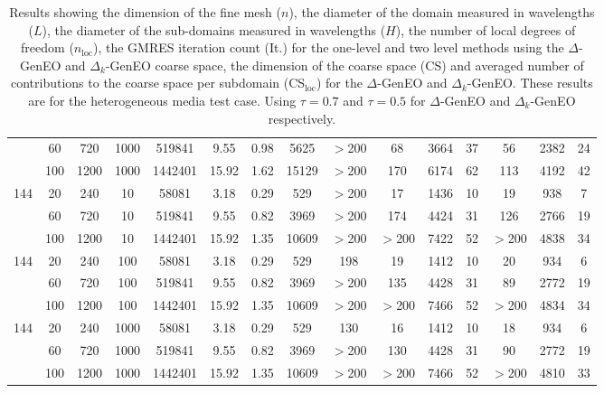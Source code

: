 \documentclass[preprint,3p,times]{elsarticle}
\theoremstyle{definition}
\numberwithin{equation}{section}
\begin{document}
{\begin{table}[H]
\begin{tabular}{cccccccc|c|ccc|ccc}
 & 60 & 720 & 1000 & 519841 &  9.55 & 0.98 & 5625 & $>$200 & 68 & 3664 & 37 & 56 & 2382 & 24 \\
 & 100 & 1200 & 1000 & 1442401 &  15.92 & 1.62 & 15129 & $>$200 & 170 & 6174 & 62 & 113 & 4192 & 42 \\
\hline
144 & 20 & 240 & 10 & 58081 & 3.18 & 0.29 & 529 & $>$200 & 17 & 1436 & 10 & 19 & 938 & 7 \\
 & 60 & 720 & 10 & 519841 &  9.55 & 0.82 & 3969 & $>$200 & 174 & 4424 & 31 & 126 & 2766 & 19 \\
 & 100 & 1200 & 10 & 1442401 &  15.92 & 1.35 & 10609 & $>$200 & $>$200 & 7422 & 52 & $>$200 & 4838 & 34 \\
\hline
144 & 20 & 240 & 100 & 58081 & 3.18 & 0.29 & 529 & 198 & 19 & 1412 & 10 & 20 & 934 & 6 \\
 & 60 & 720 & 100 & 519841 &  9.55 & 0.82 & 3969 & $>$200 & 135 & 4428 & 31 & 89 & 2772 & 19 \\
 & 100 & 1200 & 100 & 1442401 &  15.92 & 1.35 & 10609 & $>$200 & $>$200 & 7466 & 52 & $>$200 & 4834 & 34 \\
\hline
144 & 20 & 240 & 1000 & 58081 & 3.18 & 0.29 & 529 & 130 & 16 & 1412 & 10 & 18 & 934 & 6 \\
 & 60 & 720 & 1000 & 519841 &  9.55 & 0.82 & 3969 & $>$200 & 130 & 4428 & 31 & 90 & 2772 & 19 \\
 & 100 & 1200 & 1000 & 1442401 &  15.92 & 1.35 & 10609 & $>$200 & $>$200 & 7466 & 52 & $>$200 & 4810 & 33 \\
\hline
\end{tabular}
    \caption{Results showing the dimension of the fine mesh ($n$), the diameter of the domain measured in wavelengths ($L$), the diameter of the sub-domains measured in wavelengths ($H$), the number of local degrees of freedom ($n_\text{loc}$), the GMRES iteration count (It.) for the one-level and two level methods using the $\Delta$-GenEO and $\Delta_k$-GenEO coarse space, the dimension of the coarse space (CS) and averaged number of contributions to the coarse space per subdomain (CS$_\text{loc}$) for the $\Delta$-GenEO and $\Delta_k$-GenEO. These results are for the heterogeneous media test case. Using $\tau = 0.7$ and $\tau=0.5$ for $\Delta$-GenEO and $\Delta_k$-GenEO respectively.}
    \label{table:DeltaHet}
\end{table}

}
\end{document}
